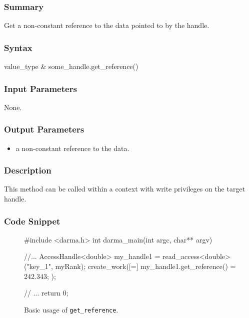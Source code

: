 \hspace{0.1cm} %
\begin{subs}
\vspace{-1.2cm}

\subsubsection{Summary} 
Get a non-constant reference to the data pointed to by the handle.

\subsubsection{Syntax} 
\begin{CppCode}
value_type & some_handle.get_reference()
\end{CppCode}

\subsubsection{Input Parameters} 
None.

\subsubsection{Output Parameters} 
\begin{itemize}
\item a non-constant reference to the data.  
\end{itemize}

\subsubsection{Description} 
This method can be called within a context with write privileges 
on the target handle.


\subsubsection{Code Snippet} 
\begin{figure}[!h]
\begin{CppCodeNumb}
#include <darma.h>
int darma_main(int argc, char** argv)
{
	//...
  AccessHandle<double> my_handle1 = read_access<double>("key_1", myRank);
  create_work([=]{
  	my_handle1.get_reference() = 242.343;
  });

  // ... 
  return 0;
}
\end{CppCodeNumb}
\label{fig:fe_api_initialaccess}
\caption{Basic usage of \texttt{get\_reference}.}
\end{figure}

\end{subs}




